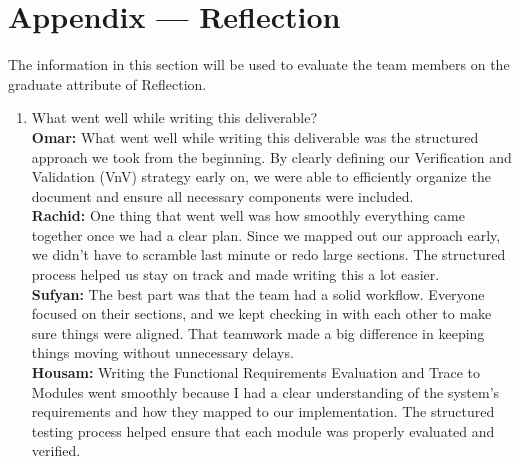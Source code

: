 \documentclass[12pt, titlepage]{article}
\begin{document}
\newpage{}
\section*{Appendix --- Reflection}

The information in this section will be used to evaluate the team members on the
graduate attribute of Reflection.



\begin{enumerate}
  \item What went well while writing this deliverable? \\
  \textbf{Omar:} What went well while writing this deliverable was the structured approach we took from the beginning. By clearly defining our Verification and Validation (VnV) strategy early on, we were able to efficiently organize the document and ensure all necessary components were included. \\
  \textbf{Rachid:} One thing that went well was how smoothly everything came together once we had a clear plan. Since we mapped out our approach early, we didn't have to scramble last minute or redo large sections. The structured process helped us stay on track and made writing this a lot easier. \\
  \textbf{Sufyan:} The best part was that the team had a solid workflow. Everyone focused on their sections, and we kept checking in with each other to make sure things were aligned. That teamwork made a big difference in keeping things moving without unnecessary delays. \\
  \textbf{Housam:} Writing the Functional Requirements Evaluation and Trace to Modules went smoothly because I had a clear understanding of the system’s requirements and how they mapped to our implementation. The structured testing process helped ensure that each module was properly evaluated and verified.\\



\end{enumerate}
\end{document}
